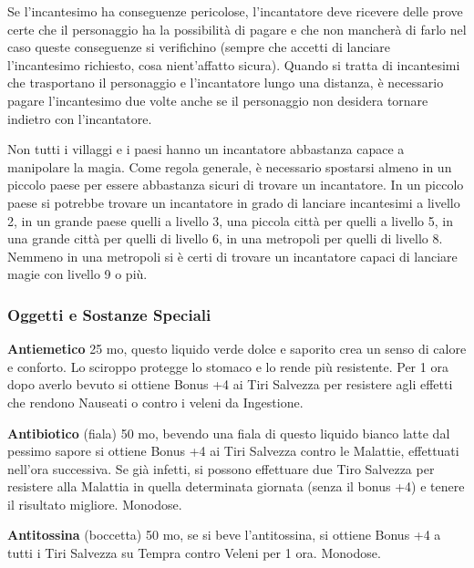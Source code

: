\begin{multicols}{2}
Se l'incantesimo ha conseguenze pericolose, l'incantatore deve ricevere delle prove certe che il personaggio ha la possibilità di pagare e che non mancherà di farlo nel caso queste conseguenze si verifichino (sempre che accetti di lanciare l'incantesimo richiesto, cosa nient'affatto sicura). Quando si tratta di incantesimi che trasportano il personaggio e l'incantatore lungo una distanza, è necessario pagare l'incantesimo due volte anche se il personaggio non desidera tornare indietro con l'incantatore.

Non tutti i villaggi e i paesi hanno un incantatore abbastanza capace a manipolare la magia. Come regola generale, è necessario spostarsi almeno in un piccolo paese per essere abbastanza sicuri di trovare un incantatore. In un piccolo paese si potrebbe trovare un incantatore in grado di lanciare incantesimi a livello 2, in un grande paese quelli a livello 3, una piccola città per quelli a livello 5, in una grande città per quelli di livello 6, in una metropoli per quelli di livello 8. Nemmeno in una metropoli si è certi di trovare un incantatore capaci di lanciare magie con livello 9 o più.


\subsubsection{Oggetti e Sostanze Speciali}

\textbf{Antiemetico} 25 mo, questo liquido verde dolce e saporito crea un senso di calore e conforto. Lo sciroppo protegge lo stomaco e lo rende più resistente. Per 1 ora dopo averlo bevuto si ottiene Bonus +4 ai Tiri Salvezza per resistere agli effetti che rendono Nauseati o contro i veleni da Ingestione.

\textbf{Antibiotico} (fiala) 50 mo, bevendo una fiala di questo liquido bianco latte dal pessimo sapore si ottiene Bonus +4 ai Tiri Salvezza contro le Malattie, effettuati nell'ora successiva. Se già infetti, si possono effettuare due Tiro Salvezza per resistere alla Malattia in quella determinata giornata (senza il bonus +4) e tenere il risultato migliore. Monodose.

\textbf{Antitossina} (boccetta) 50 mo, se si beve l'antitossina, si ottiene Bonus +4 a tutti i Tiri Salvezza su Tempra contro Veleni per 1 ora. Monodose.


\end{multicols}

